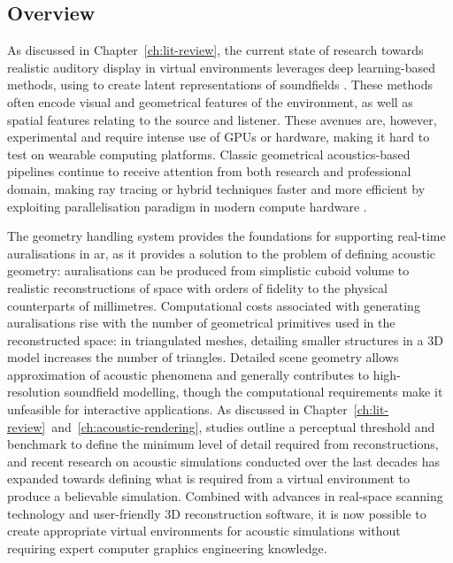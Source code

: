 \subsection{Overview}
As discussed in Chapter~\ref{ch:lit-review}, the current state of research towards realistic auditory display in virtual environments leverages deep learning-based methods, using  to create latent representations of soundfields \citep{liu2022sound, ratnarajah2022mesh2ir, chen2023everywhere}. These methods often encode visual and geometrical features of the environment, as well as spatial features relating to the source and listener. These avenues are, however, experimental and require intense use of GPUs or hardware, making it hard to test on wearable computing platforms. Classic geometrical acoustics-based pipelines continue to receive attention from both research and professional domain, making ray tracing or hybrid techniques faster and more efficient by exploiting parallelisation paradigm in modern compute hardware \citep{cowan2010gpu,diaz2021gpurir}.\par
The geometry handling system provides the foundations for supporting real-time auralisations in \acrshort{ar}, as it provides a solution to the problem of defining acoustic geometry: auralisations can be produced from simplistic cuboid volume to realistic reconstructions of space with orders of fidelity to the physical counterparts of millimetres. Computational costs associated with generating auralisations rise with the number of geometrical primitives used in the reconstructed space: in triangulated meshes, detailing smaller structures in a 3D model increases the number of triangles. Detailed scene geometry allows approximation of acoustic phenomena and generally contributes to high-resolution soundfield modelling, though the computational requirements make it unfeasible for interactive applications. As discussed in Chapter~\ref{ch:lit-review}~and~\ref{ch:acoustic-rendering}, studies outline a perceptual threshold and benchmark to define the minimum level of detail required from reconstructions, and recent research on acoustic simulations conducted over the last decades has expanded towards defining what is required from a virtual environment to produce a believable simulation. Combined with advances in real-space scanning technology and user-friendly 3D reconstruction software, it is now possible to create appropriate virtual environments for acoustic simulations without requiring expert computer graphics engineering knowledge.\par

